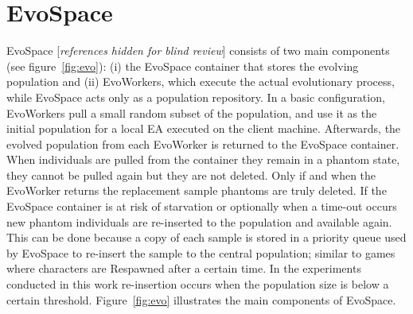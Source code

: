 \documentclass{sig-alternate}
\begin{document}
 
\section{EvoSpace}
\label{sec:evo}

EvoSpace [{\em references hidden for blind review}] consists of two main components (see figure~\ref{fig:evo}): (i) the EvoSpace 
container that stores the evolving population and (ii) EvoWorkers, which execute 
the actual evolutionary process, while EvoSpace acts only as a population repository.
In a basic configuration, EvoWorkers pull a small random subset of the 
population, and use it as the initial population for a local EA executed 
on the client machine. Afterwards, the evolved population from each EvoWorker 
is returned to the EvoSpace container. When individuals are pulled from the 
container they remain in a phantom state, they cannot be pulled again but 
they are not deleted. Only if and when the EvoWorker returns the replacement 
sample phantoms are truly deleted. If the EvoSpace container is at risk of 
starvation or optionally when a time-out occurs new phantom individuals are 
re-inserted to the population and available again. This can be done because a 
copy of each sample is stored in a priority queue used by EvoSpace to re-insert 
the sample to the central population; similar to games where characters are 
Respawned after a certain time. In the experiments conducted in this work 
re-insertion occurs when the population size is below a certain threshold. 
Figure~\ref{fig:evo} illustrates the main components of EvoSpace.
\end{document}
